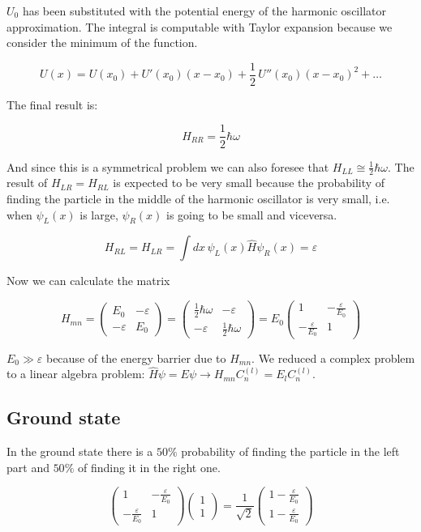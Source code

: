 $U_0$ has been substituted with the potential energy of the harmonic oscillator approximation.
The integral is computable with Taylor expansion because we consider the minimum of the function.

$$U(x)=U(x_0)+U'(x_0)(x-x_0)+\frac{1}{2}\,U''(x_0)(x-x_0)^2+\dots$$

The final result is:

$$H_{RR}=\frac{1}{2}\hbar\omega$$

And since this is a symmetrical problem we can also foresee that $H_{LL}\cong\frac{1}{2}\hbar\omega$.
The result of $H_{LR}=H_{RL}$ is expected to be very small because the probability of finding the particle in the middle of the harmonic oscillator is very small, i.e. when $\psi_L(x)$ is large, $\psi_R(x)$ is going to be small and viceversa.

$$H_{RL}=H_{LR}=\int dx\,\psi_L(x)\hat{H}\psi_R(x) = \varepsilon$$

Now we can calculate the matrix

$$H_{mn}=\begin{pmatrix}E_0 & -\varepsilon\\-\varepsilon & E_0\end{pmatrix}=\begin{pmatrix}\frac{1}{2}\hbar\omega & -\varepsilon\\-\varepsilon & \frac{1}{2}\hbar\omega\end{pmatrix}=E_0\begin{pmatrix}1 & -\frac{\varepsilon}{E_0}\\-\frac{\varepsilon}{E_0} & 1\end{pmatrix}$$

$E_0\gg \varepsilon$ because of the energy barrier due to $H_{mn}$.
We reduced a complex problem to a linear algebra problem: $\hat{H}\psi=E\psi \rightarrow H_{mn}C_n^{(l)}=E_lC_n^{(l)}$.

	\subsection{Ground state}
	In the ground state there is a $50\%$ probability of finding the particle in the left part and $50\%$ of finding it in the right one.

$$\begin{pmatrix}1 & -\frac{\varepsilon}{E_0}\\-\frac{\varepsilon}{E_0} & 1\end{pmatrix}\begin{pmatrix}1\\1\end{pmatrix}=\frac{1}{\sqrt{2}}\begin{pmatrix}1-\frac{\varepsilon}{E_0}\\1-\frac{\varepsilon}{E_0}\end{pmatrix}$$

